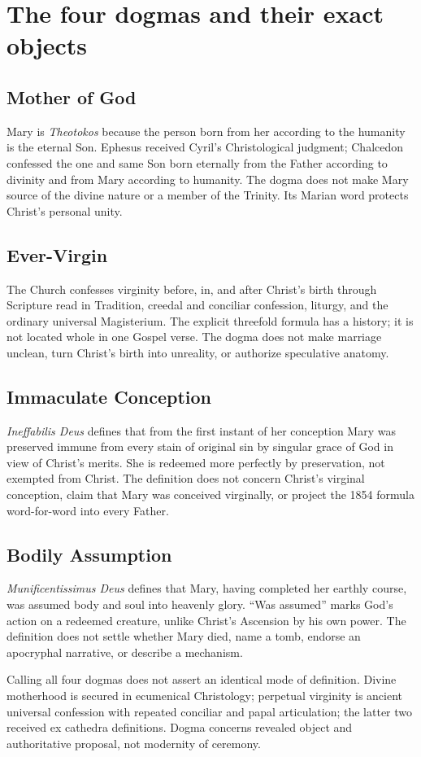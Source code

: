 \section{The four dogmas and their exact objects}

\subsection{Mother of God}

Mary is \emph{Theotokos} because the person born from her according to the
humanity is the eternal Son. Ephesus received Cyril's Christological judgment;
Chalcedon confessed the one and same Son born eternally from the Father
according to divinity and from Mary according to humanity. The dogma does not
make Mary source of the divine nature or a member of the Trinity. Its Marian
word protects Christ's personal unity.

\subsection{Ever-Virgin}

The Church confesses virginity before, in, and after Christ's birth through
Scripture read in Tradition, creedal and conciliar confession, liturgy, and the
ordinary universal Magisterium. The explicit threefold formula has a history;
it is not located whole in one Gospel verse. The dogma does not make marriage
unclean, turn Christ's birth into unreality, or authorize speculative anatomy.

\subsection{Immaculate Conception}

\emph{Ineffabilis Deus} defines that from the first instant of her conception
Mary was preserved immune from every stain of original sin by singular grace
of God in view of Christ's merits. She is redeemed more perfectly by
preservation, not exempted from Christ. The definition does not concern
Christ's virginal conception, claim that Mary was conceived virginally, or
project the 1854 formula word-for-word into every Father.

\subsection{Bodily Assumption}

\emph{Munificentissimus Deus} defines that Mary, having completed her earthly
course, was assumed body and soul into heavenly glory. ``Was assumed'' marks
God's action on a redeemed creature, unlike Christ's Ascension by his own
power. The definition does not settle whether Mary died, name a tomb, endorse
an apocryphal narrative, or describe a mechanism.

Calling all four dogmas does not assert an identical mode of definition.
Divine motherhood is secured in ecumenical Christology; perpetual virginity is
ancient universal confession with repeated conciliar and papal articulation;
the latter two received ex cathedra definitions. Dogma concerns revealed
object and authoritative proposal, not modernity of ceremony.

